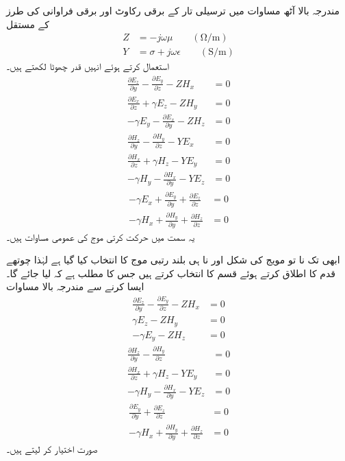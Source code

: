 مندرجہ بالا آٹھ مساوات میں ترسیلی تار کے برقی رکاوٹ  اور برقی فراوانی  کی طرز کے مستقل
\begin{align}\label{مساوت_مویج_رکاوٹ_فراوانی}
Z&=-j \omega \mu  \quad \quad \left(\si{\ohm / \meter} \right) \\
Y&=\sigma +j \omega \epsilon \quad \quad \left(\si{\siemens / \meter} \right)
\end{align}
استعمال کرتے ہوئے انہیں قدر چھوٹا لکھتے ہیں۔
\begin{align}
\frac{\partial E_z}{\partial y}-\frac{\partial E_y}{\partial z}-Z H_x&=0  \\
\frac{\partial E_x}{\partial z}+\gamma E_z-Z H_y&=0  \\
-\gamma E_y-\frac{\partial E_x}{\partial y}-Z H_z&=0
\end{align}
%
\begin{align}
\frac{\partial H_z}{\partial y}-\frac{\partial H_y}{\partial z}-YE_x&=0 \\
\frac{\partial H_x}{\partial z}+\gamma H_z-YE_y&=0  \\
-\gamma H_y-\frac{\partial H_x}{\partial y}-YE_z&=0 
\end{align}
%
\begin{align}
-\gamma E_x+\frac{\partial E_y}{\partial y}+\frac{\partial E_z}{\partial z}&=0 \\
-\gamma H_x+\frac{\partial H_y}{\partial y}+\frac{\partial H_z}{\partial z}&=0 \label{مساوات_مویج_مستطیلی_تیسرا_قدم_ختم}
\end{align}
 یہ  سمت میں حرکت کرتی موج کی عمومی مساوات ہیں۔

ابھی تک نا تو مویج کی شکل اور نا ہی بلند رتبی موج  کا انتخاب کیا گیا ہے لہٰذا چوتھے قدم کا اطلاق کرتے ہوئے  قسم کا انتخاب کرتے ہیں جس کا مطلب ہے کہ  لیا جائے گا۔ایسا کرنے سے مندرجہ بالا مساوات   
\begin{align}
\frac{\partial E_z}{\partial y}-\frac{\partial E_y}{\partial z}-Z H_x&=0  \label{مساوات_مویج_الف}\\
\gamma E_z-Z H_y&=0  \label{مساوات_مویج_ب}\\
-\gamma E_y-Z H_z&=0\label{مساوات_مویج_پ}
\end{align}
%
\begin{align}
\frac{\partial H_z}{\partial y}-\frac{\partial H_y}{\partial z}&=0 \label{مساوات_مویج_ت}\\
\frac{\partial H_x}{\partial z}+\gamma H_z-YE_y&=0  \label{مساوات_مویج_ٹ}\\
-\gamma H_y-\frac{\partial H_x}{\partial y}-YE_z&=0 \label{مساوات_مویج_ث}
\end{align}
%
\begin{align}
\frac{\partial E_y}{\partial y}+\frac{\partial E_z}{\partial z}&=0 \label{مساوات_مویج_ج}\\
-\gamma H_x+\frac{\partial H_y}{\partial y}+\frac{\partial H_z}{\partial z}&=0\label{مساوات_مویج_چ}
\end{align}
صورت اختیار کر لیتے ہیں۔

